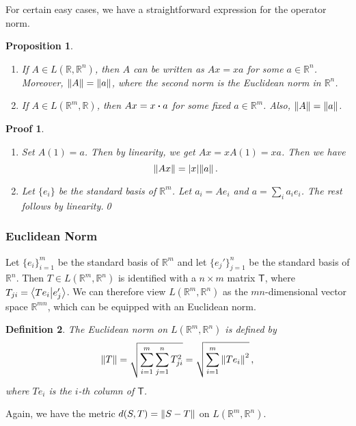 \documentclass{article}
\theoremstyle{plain}\theoremheaderfont{\normalfont\itshape}\theorembodyfont{\rmfamily}\theoremseparator{.}\newtheorem*{rem}{Remark}\newtheorem*{ex}{Example}\newtheorem*{proof}{Proof}\newtheorem*{altp}{Alternative proof}
\theoremstyle{plain}\theoremheaderfont{\normalfont\bfseries}\theorembodyfont{\rmfamily}\theoremseparator{.}\newtheorem{thm}{Theorem}[section]\newtheorem{lem}[thm]{Lemma}\newtheorem{prop}[thm]{Proposition}\newtheorem*{cor}{Corollary}\newtheorem{defn}[thm]{Definition}\newtheorem{clm}[thm]{Claim}\newtheorem{clminproof}{Claim}
\theoremstyle{break}\theoremheaderfont{\normalfont\itshape}\theorembodyfont{\rmfamily}\theoremseparator{.\medskip}\newtheorem*{proofskip}{Proof}\newtheorem*{exs}{Examples}\newtheorem*{rems}{Remarks}
\theoremstyle{break}\theoremheaderfont{\normalfont\bfseries}\theorembodyfont{\rmfamily}\theoremseparator{.\medskip}\newtheorem{lemskip}[thm]{Lemma}\newtheorem{defnskip}[thm]{Definition}\newtheorem{propskip}[thm]{Proposition}\newtheorem{thmskip}[thm]{Theorem}
\newcommand{\qed}{\hfill\ensuremath{\Box}}
\begin{document}
    For certain easy cases, we have a straightforward expression for the operator norm.
    \begin{propskip}
        \begin{enumerate}[label=(\roman*),topsep=0pt]
            \item If \(A\in L(\mathbb{R},\mathbb{R}^n)\), then \(A\) can be written as \(Ax=xa\) for some \(a\in\mathbb{R}^n\). Moreover, \(\norm{A}=\norm{a}\), where the second norm is the Euclidean norm in \(\mathbb{R}^n\).
            \item If \(A\in L(\mathbb{R}^m,\mathbb{R})\), then \(Ax=x\vdot a\) for some fixed \(a\in\mathbb{R}^m\). Also, \(\norm{A}=\norm{a}\).
        \end{enumerate}
    \end{propskip}
    \begin{proofskip}
        \begin{enumerate}[label=(\roman*),topsep=0pt]
            \item Set \(A(1)=a\). Then by linearity, we get \(Ax=xA(1)=xa\). Then we have
            \[\norm{Ax}=\abs{x}\norm{a}\,.\]
            \item Let \(\{e_i\}\) be the standard basis of \(\mathbb{R}^m\). Let \(a_i=Ae_i\) and \(a=\sum_i a_ie_i\). The rest follows by linearity.\qed
        \end{enumerate}
    \end{proofskip}

    \subsubsection{Euclidean Norm}
    Let \(\{e_i\}_{i=1}^{m}\) be the standard basis of \(\mathbb{R}^m\) and let \(\{e_j'\}_{j=1}^{n}\) be the standard basis of \(\mathbb{R}^n\). Then \(T\in L(\mathbb{R}^m,\mathbb{R}^n)\) is identified with a \(n\times m\) matrix \(\mathsf{T}\), where \(T_{ji}=\braket{Te_i}{e_j'}\). We can therefore view \(L(\mathbb{R}^m,\mathbb{R}^n)\) as the \(mn\)-dimensional vector space \(\mathbb{R}^{mn}\), which can be equipped with an Euclidean norm.
    \begin{defn}
        The \textit{Euclidean norm} on \(L(\mathbb{R}^m,\mathbb{R}^n)\) is defined by
        \[\norm{T}=\sqrt{\sum_{i=1}^{m}\sum_{j=1}^{n}T_{ji}^2}=\sqrt{\sum_{i=1}^{m}\norm{Te_i}^2}\,,\]
        where \(Te_i\) is the \(i\)-th column of \(\mathsf{T}\). 
    \end{defn}
    Again, we have the metric \(d(S,T)=\norm{S-T}\) on \(L(\mathbb{R}^m,\mathbb{R}^n)\).
\end{document}
